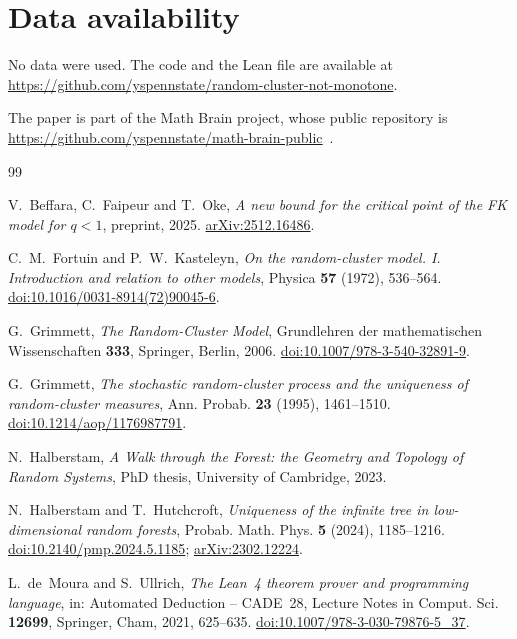 \documentclass[11pt]{amsart}
\theoremstyle{remark}
\numberwithin{equation}{section}
\begin{document}
\section*{Data availability}
No data were used. The code and the Lean file are available at \url{https://github.com/yspennstate/random-cluster-not-monotone}.

The paper is part of the Math Brain project, whose public repository is \url{https://github.com/yspennstate/math-brain-public}~\cite{MathBrainRepo}.

\begin{thebibliography}{99}

V.~Beffara, C.~Faipeur and T.~Oke,
\emph{A new bound for the critical point of the FK model for $q<1$},
preprint, 2025.
\href{https://arxiv.org/abs/2512.16486}{arXiv:2512.16486}.

C.~M.~Fortuin and P.~W.~Kasteleyn,
\emph{On the random-cluster model. I. Introduction and relation to other models},
Physica \textbf{57} (1972), 536--564.
\href{https://doi.org/10.1016/0031-8914(72)90045-6}{doi:10.1016/0031-8914(72)90045-6}.

G.~Grimmett,
\emph{The Random-Cluster Model},
Grundlehren der mathematischen Wissenschaften \textbf{333}, Springer, Berlin, 2006.
\href{https://doi.org/10.1007/978-3-540-32891-9}{doi:10.1007/978-3-540-32891-9}.

G.~Grimmett,
\emph{The stochastic random-cluster process and the uniqueness of random-cluster measures},
Ann. Probab. \textbf{23} (1995), 1461--1510.
\href{https://doi.org/10.1214/aop/1176987791}{doi:10.1214/aop/1176987791}.

N.~Halberstam,
\emph{A Walk through the Forest: the Geometry and Topology of Random Systems},
PhD thesis, University of Cambridge, 2023.

N.~Halberstam and T.~Hutchcroft,
\emph{Uniqueness of the infinite tree in low-dimensional random forests},
Probab. Math. Phys. \textbf{5} (2024), 1185--1216.
\href{https://doi.org/10.2140/pmp.2024.5.1185}{doi:10.2140/pmp.2024.5.1185};
\href{https://arxiv.org/abs/2302.12224}{arXiv:2302.12224}.

L.~de~Moura and S.~Ullrich,
\emph{The Lean~4 theorem prover and programming language},
in: Automated Deduction -- CADE~28, Lecture Notes in Comput. Sci. \textbf{12699}, Springer, Cham, 2021, 625--635.
\href{https://doi.org/10.1007/978-3-030-79876-5_37}{doi:10.1007/978-3-030-79876-5\_37}.


\end{thebibliography}
\end{document}
